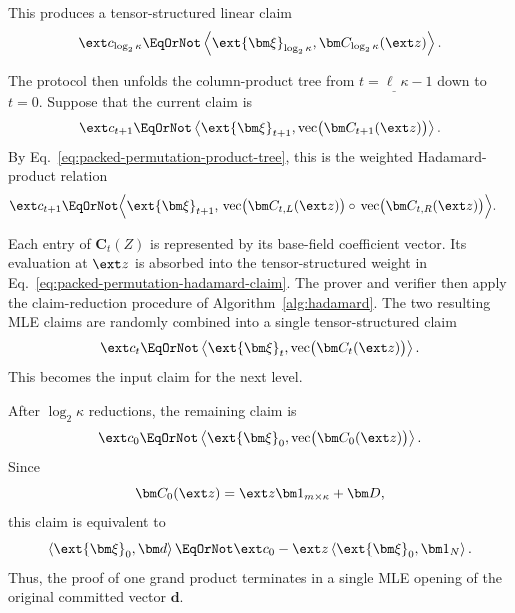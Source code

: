 This produces a
tensor-structured linear claim
\begin{equation*}
    \ext c_{\log_2 \kappa}
    \EqOrNot
    \left\langle
        \ext{\bm\xi}_{\log_2 \kappa},
        \bm C_{\log_2 \kappa}(\ext z)
    \right\rangle.
\end{equation*}

The protocol then unfolds the column-product tree from
\(t=\ell_\_\kappa-1\) down to \(t=0\). Suppose that the current
claim is
\begin{equation*}
    \ext c_{t+1}
    \EqOrNot
    \left\langle
        \ext{\bm\xi}_{t+1},
        \operatorname{vec}
        \bigl(\bm C_{t+1}(\ext z)\bigr)
    \right\rangle.
\end{equation*}
By Eq.~\eqref{eq:packed-permutation-product-tree}, this is the
weighted Hadamard-product relation
\begin{equation}
\begin{aligned}
    \ext c_{t+1}
    \EqOrNot
    \Bigl\langle
        \ext{\bm\xi}_{t+1},\,
        &\operatorname{vec}
        \bigl(\bm C_{t,L}(\ext z)\bigr)
        \circ\,
        \operatorname{vec}
        \bigl(\bm C_{t,R}(\ext z)\bigr)
    \Bigr\rangle.
\end{aligned}
\label{eq:packed-permutation-hadamard-claim}
\end{equation}

Each entry of \(\bm C_t(Z)\) is represented by its base-field
coefficient vector. Its evaluation at \(\ext z\) is absorbed into
the tensor-structured weight in
Eq.~\eqref{eq:packed-permutation-hadamard-claim}. The prover and
verifier then apply the claim-reduction procedure of
Algorithm~\ref{alg:hadamard}. The two resulting MLE claims are
randomly combined into a single tensor-structured claim
\begin{equation*}
    \ext c_t
    \EqOrNot
    \left\langle
        \ext{\bm\xi}_t,
        \operatorname{vec}
        \bigl(\bm C_t(\ext z)\bigr)
    \right\rangle.
\end{equation*}
This becomes the input claim for the next level.

After \(\log_2 \kappa\) reductions, the remaining claim is
\[
    \ext c_0
    \EqOrNot
    \left\langle
        \ext{\bm\xi}_0,
        \operatorname{vec}
        \bigl(\bm C_0(\ext z)\bigr)
    \right\rangle.
\]
Since
\[
    \bm C_0(\ext z)
    =
    \ext z\bm 1_{m\times\kappa}+\bm D,
\]
this claim is equivalent to
\begin{equation*}
    \left\langle
        \ext{\bm\xi}_0,\bm d
    \right\rangle
    \EqOrNot
    \ext c_0
    -
    \ext z
    \left\langle
        \ext{\bm\xi}_0,\bm 1_N
    \right\rangle.
\end{equation*}
Thus, the proof of one grand product terminates in a single MLE
opening of the original committed vector \(\bm d\).

